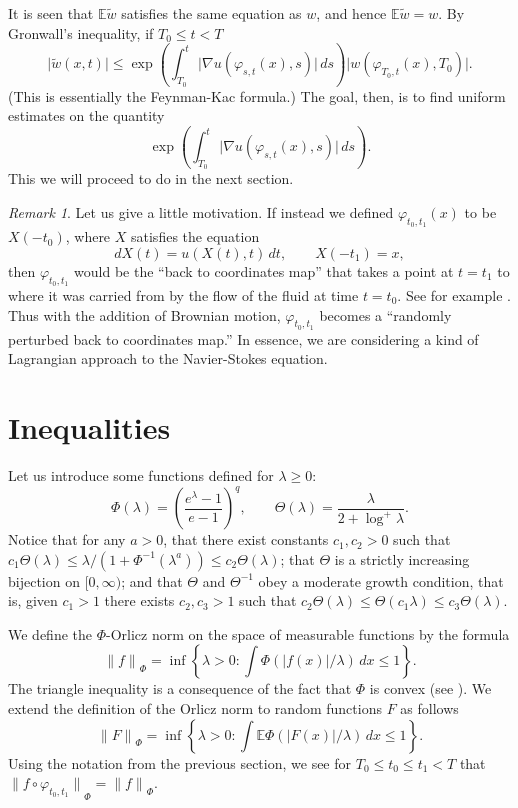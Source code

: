 \documentclass[12pt]{amsart}
\theoremstyle{remark}
\newtheorem{rem}[thm]{Remark}
\newcommand{\E}{{\mathbb E}}
\newcommand{\smodo}[1]{{\mathopen|#1\mathclose|}}
\newcommand{\snormo}[1]{{\mathopen\|#1\mathclose\|}}
\begin{document}
It is seen that $\E\tilde w$ satisfies the same equation as $w$, and
hence $\E \tilde w = w$.
By Gronwall's inequality, if $T_0 \le t < T$
$$ \smodo{\tilde w(x,t)}
   \le
   \exp\left(\int_{T_0}^t \smodo{\nabla u(\varphi_{s,t}(x),s)} \, ds\right)
   \smodo{w(\varphi_{T_0,t}(x),T_0)} .$$
(This is essentially the Feynman-Kac formula.)
The goal, then, is to find uniform estimates on the quantity
$$ \exp\left(\int_{T_0}^t \smodo{\nabla u(\varphi_{s,t}(x),s)} \, ds\right) .$$
This we will proceed to do in the next section.

\begin{rem}
Let us give a little motivation.  If instead we defined $\varphi_{t_0,t_1}(x)$
to be $X(-t_0)$, where $X$ satisfies
the equation
$$ dX(t) = u(X(t),t) \, dt,
   \qquad
   X(-t_1) = x ,$$
then $\varphi_{t_0,t_1}$ would be the ``back to coordinates map'' that
takes a point at $t=t_1$ to where it was carried from by the flow of the
fluid at time $t=t_0$.
See for
example \cite{constantin}.  Thus with the addition of Brownian
motion, $\varphi_{t_0,t_1}$ 
becomes a ``randomly perturbed back to coordinates map.''
In essence, we are considering a kind of Lagrangian approach to the
Navier-Stokes equation.
\end{rem}

\section{Inequalities}

Let us 
introduce some functions defined for $\lambda \ge 0$:
$$ \Phi(\lambda) = \left(\frac{e^\lambda-1}{e-1}\right)^q ,\qquad
   \Theta(\lambda) = \frac\lambda{2+\log^+\lambda} .$$
Notice that for any $a>0$, that
there exist constants $c_1,c_2>0$ such that
$c_1 \Theta(\lambda) \le \lambda/(1+\Phi^{-1}(\lambda^a)) 
\le c_2 \Theta(\lambda)$;
that $\Theta$ is a strictly increasing bijection on $[0,\infty)$;
and that $\Theta$ and $\Theta^{-1}$ obey a moderate growth condition, that is,
given $c_1>1$ there exists $c_2,c_3>1$ such that $c_2 \Theta(\lambda) \le
\Theta(c_1 \lambda) \le c_3 \Theta(\lambda)$.

We define the
$\Phi$-Orlicz norm on
the space of measurable functions by the formula
$$ \snormo f_\Phi = 
   \inf\left\{\lambda>0:
   \int \Phi(\smodo{f(x)}/\lambda) \, dx \le 1 \right\} .$$
The triangle inequality is a consequence of the fact that
$\Phi$ is convex (see \cite{kras-rutickii}).
We extend the definition of the Orlicz norm to random
functions $F$ as follows
$$ \snormo F_\Phi = 
   \inf\left\{\lambda>0:
   \int \E \Phi(\smodo{F(x)}/\lambda) \, dx \le 1 \right\} .$$
Using the notation from the previous section,
we see for $T_0 \le t_0 \le t_1 < T$ that
$\snormo{f\circ\varphi_{t_0,t_1}}_\Phi = \snormo f_\Phi$.
\end{document}
